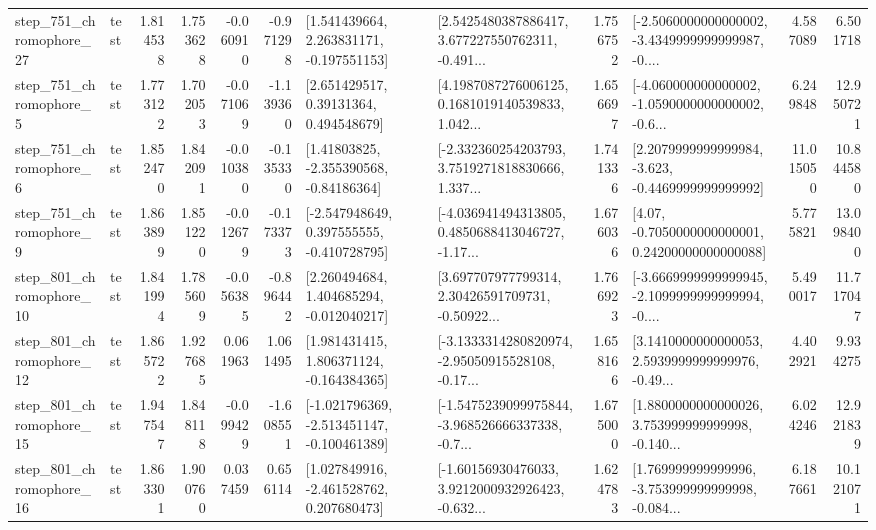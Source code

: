 \begin{tabular}{llrrrrllrlrr}
  step\_751\_chromophore\_27 &      test &      1.814538 &    1.753628 &     -0.060910 & -0.971298 &    [1.541439664, 2.263831171, -0.197551153] &  [2.5425480387886417, 3.677227550762311, -0.491... &       1.756752 &  [-2.5060000000000002, -3.4349999999999987, -0.... &            4.587089 &          6.501718 \\
   step\_751\_chromophore\_5 &      test &      1.773122 &    1.702053 &     -0.071069 & -1.139360 &      [2.651429517, 0.39131364, 0.494548679] &  [4.1987087276006125, 0.1681019140539833, 1.042... &       1.656697 &  [-4.060000000000002, -1.0590000000000002, -0.6... &            6.249848 &         12.950721 \\
   step\_751\_chromophore\_6 &      test &      1.852470 &    1.842091 &     -0.010380 & -0.135330 &     [1.41803825, -2.355390568, -0.84186364] &  [-2.332360254203793, 3.7519271818830666, 1.337... &       1.741336 &  [2.2079999999999984, -3.623, -0.4469999999999992] &           11.015050 &         10.844580 \\
   step\_751\_chromophore\_9 &      test &      1.863899 &    1.851220 &     -0.012679 & -0.173373 &   [-2.547948649, 0.397555555, -0.410728795] &  [-4.036941494313805, 0.4850688413046727, -1.17... &       1.676036 &   [4.07, -0.7050000000000001, 0.24200000000000088] &            5.775821 &         13.098400 \\
  step\_801\_chromophore\_10 &      test &      1.841994 &    1.785609 &     -0.056385 & -0.896442 &    [2.260494684, 1.404685294, -0.012040217] &  [3.697707977799314, 2.30426591709731, -0.50922... &       1.766923 &  [-3.6669999999999945, -2.1099999999999994, -0.... &            5.490017 &         11.717047 \\
  step\_801\_chromophore\_12 &      test &      1.865722 &    1.927685 &      0.061963 &  1.061495 &    [1.981431415, 1.806371124, -0.164384365] &  [-3.1333314280820974, -2.95050915528108, -0.17... &       1.658166 &  [3.1410000000000053, 2.5939999999999976, -0.49... &            4.402921 &          9.934275 \\
  step\_801\_chromophore\_15 &      test &      1.947547 &    1.848118 &     -0.099429 & -1.608551 &  [-1.021796369, -2.513451147, -0.100461389] &  [-1.5475239099975844, -3.968526666337338, -0.7... &       1.675000 &  [1.8800000000000026, 3.753999999999998, -0.140... &            6.024246 &         12.921839 \\
  step\_801\_chromophore\_16 &      test &      1.863301 &    1.900760 &      0.037459 &  0.656114 &    [1.027849916, -2.461528762, 0.207680473] &  [-1.60156930476033, 3.9212000932926423, -0.632... &       1.624783 &  [1.769999999999996, -3.753999999999998, -0.084... &            6.187661 &         10.121071 \\

\end{tabular}
